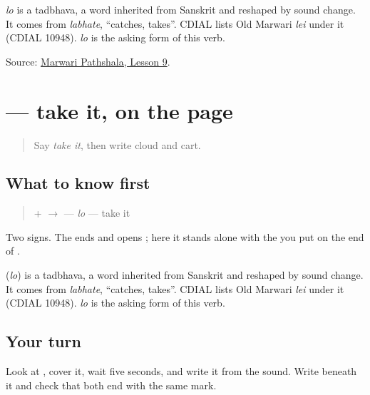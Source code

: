 \begin{cousinweb}
\emph{lo} is a tadbhava, a word inherited from Sanskrit and reshaped by sound change. It comes from \emph{labhate}, \textquotedblleft{}catches, takes\textquotedblright{}. CDIAL lists Old Marwari \emph{lei} under it (CDIAL 10948). \emph{lo} is the asking form of this verb.
\end{cousinweb}

\begin{tcolorbox}[breakable,colback=teal!4,colframe=teal!35!black,title={Before you move on}]
Source: \href{https://www.marwaripathshala.com/marwari-lesson-9-english}{Marwari Pathshala, Lesson 9}.
\end{tcolorbox}
\section[\texorpdfstring{\mw{लो} (lo)}{लो (lo)}]{ — take it, on the page}

\label{lesson:MW-C24-lo}



\begin{quote}
Say \emph{take it}, then write cloud and cart.
\end{quote}

\subsection*{What to know first}
\begin{quote}
\textbf{} + \textbf{} $\to$ \textbf{} — \emph{lo} — take it
\end{quote}

Two signs. The \textbf{} ends \textbf{} and opens \textbf{}; here it stands alone with the \textbf{} you put on the end of \textbf{}.

\begin{cousinweb}
\textbf{} (\emph{lo}) is a tadbhava, a word inherited from Sanskrit and reshaped by sound change. It comes from \emph{labhate}, \textquotedblleft{}catches, takes\textquotedblright{}. CDIAL lists Old Marwari \emph{lei} under it (CDIAL 10948). \emph{lo} is the asking form of this verb.
\end{cousinweb}

\subsection*{Your turn}
Look at \textbf{}, cover it, wait five seconds, and write it from the sound. Write \textbf{} beneath it and check that both end with the same mark.

